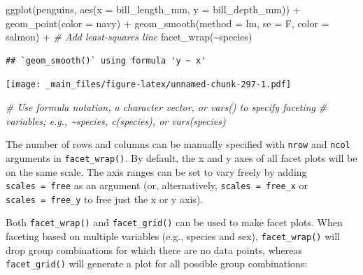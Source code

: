 \documentclass[
]{book}
\newenvironment{Shaded}{\begin{snugshade}}{\end{snugshade}}
\newcommand{\AttributeTok}[1]{\textcolor[rgb]{0.77,0.63,0.00}{#1}}
\newcommand{\CommentTok}[1]{\textcolor[rgb]{0.56,0.35,0.01}{\textit{#1}}}
\newcommand{\FunctionTok}[1]{\textcolor[rgb]{0.00,0.00,0.00}{#1}}
\newcommand{\NormalTok}[1]{#1}
\newcommand{\SpecialCharTok}[1]{\textcolor[rgb]{0.00,0.00,0.00}{#1}}
\newcommand{\StringTok}[1]{\textcolor[rgb]{0.31,0.60,0.02}{#1}}
\begin{document}
\begin{Shaded}
\begin{Highlighting}[]
\FunctionTok{ggplot}\NormalTok{(penguins, }\FunctionTok{aes}\NormalTok{(}\AttributeTok{x =}\NormalTok{ bill\_length\_mm, }\AttributeTok{y =}\NormalTok{ bill\_depth\_mm)) }\SpecialCharTok{+}
  \FunctionTok{geom\_point}\NormalTok{(}\AttributeTok{color =} \StringTok{\textquotesingle{}navy\textquotesingle{}}\NormalTok{) }\SpecialCharTok{+}
  \FunctionTok{geom\_smooth}\NormalTok{(}\AttributeTok{method =} \StringTok{\textquotesingle{}lm\textquotesingle{}}\NormalTok{, }\AttributeTok{se =}\NormalTok{ F, }\AttributeTok{color =} \StringTok{\textquotesingle{}salmon\textquotesingle{}}\NormalTok{) }\SpecialCharTok{+} \CommentTok{\# Add least{-}squares line}
  \FunctionTok{facet\_wrap}\NormalTok{(}\SpecialCharTok{\textasciitilde{}}\NormalTok{species)}
\end{Highlighting}
\end{Shaded}

\begin{verbatim}
## `geom_smooth()` using formula 'y ~ x'
\end{verbatim}

\texttt{[image: \_main\_files/figure-latex/unnamed-chunk-297-1.pdf]}

\begin{Shaded}
\begin{Highlighting}[]
\CommentTok{\# Use formula notation, a character vector, or vars() to specify faceting}
\CommentTok{\# variables; e.g., \textasciitilde{}species, c(\textquotesingle{}species\textquotesingle{}), or vars(species)}
\end{Highlighting}
\end{Shaded}

The number of rows and columns can be manually specified with \texttt{nrow} and \texttt{ncol} arguments in \texttt{facet\_wrap()}. By default, the x and y axes of all facet plots will be on the same scale. The axis ranges can be set to vary freely by adding \texttt{scales\ =\ \textquotesingle{}free\textquotesingle{}} as an argument (or, alternatively, \texttt{scales\ =\ \textquotesingle{}free\_x\textquotesingle{}} or \texttt{scales\ =\ \textquotesingle{}free\_y\textquotesingle{}} to free just the x or y axis).

Both \texttt{facet\_wrap()} and \texttt{facet\_grid()} can be used to make facet plots. When faceting based on multiple variables (e.g., species and sex), \texttt{facet\_wrap()} will drop group combinations for which there are no data points, whereas \texttt{facet\_grid()} will generate a plot for all possible group combinations:
\end{document}
